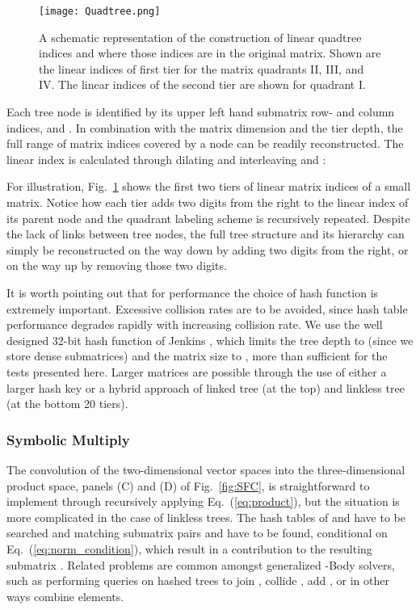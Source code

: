 \begin{figure}
\texttt{[image: Quadtree.png]}
\caption{\label{fig:linear_quadtree} A schematic representation of the
construction of linear quadtree indices and where those indices are in the
original matrix. Shown are the linear indices of first tier for the matrix
quadrants II, III, and IV. The linear indices of the second tier are shown for
quadrant I.}
\end{figure}

Each tree node is identified by its upper left hand submatrix row- and column
indices,  and . In combination with the matrix dimension and the tier
depth, the full range of matrix indices covered by a node can be readily
reconstructed.  The linear index  is calculated through dilating and
interleaving  and :

For illustration, Fig.~\ref{fig:linear_quadtree} shows the first two tiers of
linear matrix indices of a small matrix. Notice how each tier adds two digits
from the right to the linear index of its parent node and the quadrant labeling
scheme is recursively repeated. Despite the lack of links between tree nodes,
the full tree structure and its hierarchy can simply be reconstructed on the
way down by adding two digits from the right, or on the way up by removing
those two digits.

It is worth pointing out that for performance the choice of hash function is
extremely important. Excessive collision rates are to be avoided, since hash
table performance degrades rapidly with increasing collision rate. We use the
well designed 32-bit hash function of Jenkins \cite{Jenkins2006}, which limits
the tree depth to  (since we store  dense submatrices) and
the matrix size to , more than sufficient for the tests
presented here. Larger matrices are possible through the use of either a larger
hash key or a hybrid approach of linked tree (at the top) and linkless tree (at
the bottom 20 tiers).

\subsubsection{Symbolic Multiply}
\label{sec:symbolic_multiply}

The convolution of the two-dimensional vector spaces into the
three-dimensional product space, panels (C) and (D) of Fig.~\ref{fig:SFC}, is
straightforward to implement through recursively applying
Eq.~(\ref{eq:product}), but the situation is more complicated in the case of
linkless trees. The hash tables of  and  have to be searched and
matching submatrix pairs  and  have to be found, conditional
on Eq.~(\ref{eq:norm_condition}), which result in a contribution to the
resulting submatrix . Related problems are common amongst generalized
-Body solvers, such as performing queries on hashed trees to join
\cite{Amossen:2009:SpMMeqJoin}, collide \cite{AVRIL:2009:HAL-00412870:1}, add
\cite{Warren:1995:HOT}, or in other ways combine elements.

